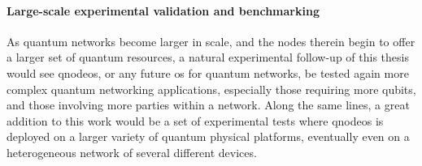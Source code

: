 \paragraph{Large-scale experimental validation and benchmarking}

As quantum networks become larger in scale, and the nodes therein begin to offer a larger set of
quantum resources, a natural experimental follow-up of this thesis would see \acrshort{qnodeos}, or
any future \acrshort{os} for quantum networks, be tested again more complex quantum networking
applications, especially those requiring more qubits, and those involving more parties within a
network. Along the same lines, a great addition to this work would be a set of experimental tests
where \acrshort{qnodeos} is deployed on a larger variety of quantum physical platforms, eventually
even on a heterogeneous network of several different devices.

\begin{xstretch}
\printbibliography[heading=subbibintoc,title={References},notcategory=noprint]
\end{xstretch}
